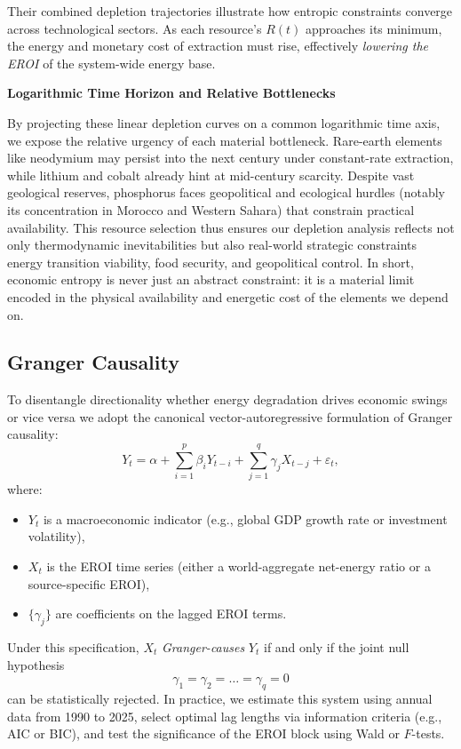 \documentclass[a4paper,12pt]{article}
\begin{document}
Their combined depletion trajectories illustrate how entropic constraints converge across technological sectors. As each resource’s $R(t)$ approaches its minimum, the energy and monetary cost of extraction must rise, effectively \textit{lowering the EROI} of the system-wide energy base.

\vspace{1em}
\noindent\textbf{Logarithmic Time Horizon and Relative Bottlenecks}

\vspace{0.3em}
By projecting these linear depletion curves on a common logarithmic time axis, we expose the relative urgency of each material bottleneck. Rare-earth elements like neodymium may persist into the next century under constant-rate extraction, while lithium and cobalt already hint at mid-century scarcity. Despite vast geological reserves, phosphorus faces geopolitical and ecological hurdles (notably its concentration in Morocco and Western Sahara) that constrain practical availability.
This resource selection thus ensures our depletion analysis reflects not only thermodynamic inevitabilities but also real-world strategic constraints energy transition viability, food security, and geopolitical control. In short, economic entropy is never just an abstract constraint: it is a material limit encoded in the physical availability and energetic cost of the elements we depend on.

\subsection{Granger Causality}
To disentangle directionality whether energy degradation drives economic swings or vice versa we adopt the canonical vector-autoregressive formulation of Granger causality:
\[
    Y_{t} = \alpha + \sum_{i=1}^{p} \beta_{i} Y_{t-i} + \sum_{j=1}^{q} \gamma_{j} X_{t-j} + \varepsilon_{t},
\]
where:
\begin{itemize}
    \item $Y_{t}$ is a macroeconomic indicator (e.g., global GDP growth rate or investment volatility),
    \item $X_{t}$ is the EROI time series (either a world-aggregate net-energy ratio or a source-specific EROI),
    \item $\{\gamma_{j}\}$ are coefficients on the lagged EROI terms.
\end{itemize}

Under this specification, $X_t$ \textit{Granger-causes} $Y_t$ if and only if the joint null hypothesis
\[
    \gamma_{1} = \gamma_{2} = \dots = \gamma_{q} = 0
\]
can be statistically rejected. In practice, we estimate this system using annual data from 1990 to 2025, select optimal lag lengths via information criteria (e.g., AIC or BIC), and test the significance of the EROI block using Wald or $F$-tests.
\end{document}
